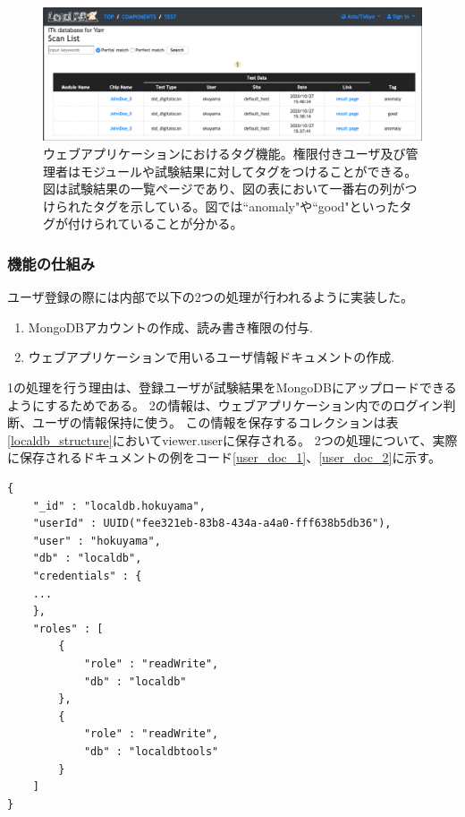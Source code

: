 \begin{figure}[bpt]\centering
\includegraphics[width=12cm]{./viewer_tag.png}
\caption[ウェブアプリケーションにおけるタグ機能]{ウェブアプリケーションにおけるタグ機能。権限付きユーザ及び管理者はモジュールや試験結果に対してタグをつけることができる。図は試験結果の一覧ページであり、図の表において一番右の列がつけられたタグを示している。図では``anomaly"や``good"といったタグが付けられていることが分かる。}
\label{webapp_tag}
\end{figure}

\clearpage

\subsubsection{機能の仕組み}
ユーザ登録の際には内部で以下の2つの処理が行われるように実装した。

\begin{enumerate}
  \item MongoDBアカウントの作成、読み書き権限の付与.
  \item ウェブアプリケーションで用いるユーザ情報ドキュメントの作成.
\end{enumerate}

1の処理を行う理由は、登録ユーザが試験結果をMongoDBにアップロードできるようにするためである。
2の情報は、ウェブアプリケーション内でのログイン判断、ユーザの情報保持に使う。
この情報を保存するコレクションは表\ref{localdb_structure}においてviewer.userに保存される。
2つの処理について、実際に保存されるドキュメントの例をコード\ref{user_doc_1}、\ref{user_doc_2}に示す。

\begin{lstlisting}[basicstyle=\scriptsize,caption=MongoDBアカウント情報を持つドキュメントの例。リスト中の``roles"より、localdbとlocaldbtoolsの読み書き権限が付加されていることが分かる。,label=user_doc_1]
{
	"_id" : "localdb.hokuyama",
	"userId" : UUID("fee321eb-83b8-434a-a4a0-fff638b5db36"),
	"user" : "hokuyama",
	"db" : "localdb",
	"credentials" : {
    ...
	},
	"roles" : [
		{
			"role" : "readWrite",
			"db" : "localdb"
		},
		{
			"role" : "readWrite",
			"db" : "localdbtools"
		}
	]
}
\end{lstlisting}

